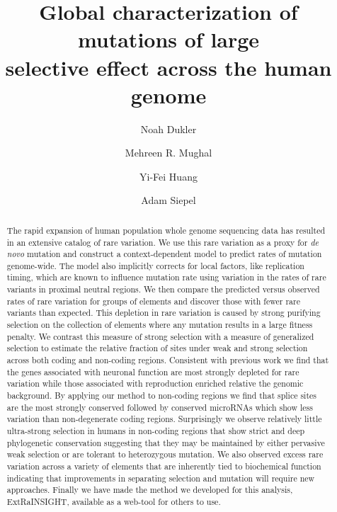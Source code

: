 \documentclass[11pt]{article}
\title{Global characterization of mutations of large \\
  selective effect across the human genome}
\author[1]{Noah Dukler}
\author[1]{Mehreen R. Mughal}
\author[2]{Yi-Fei Huang}
\author[1]{Adam Siepel}
\affil[1]{Simons Center for Quantitative Biology, Cold Spring Harbor Laboratory, Cold Spring Harbor, NY}
\affil[2]{Department of Biology and Huck Institutes of the Life Sciences, University Park, PA}
\date{}
\begin{document}
\maketitle


\begin{abstract}
The rapid expansion of human population whole genome sequencing data has resulted in an extensive catalog of rare variation. We use this rare variation as a proxy for \textit{de novo} mutation and construct a context-dependent model to predict rates of mutation genome-wide. The model also implicitly corrects for local factors, like replication timing, which are known to influence mutation rate using variation in the rates of rare variants in proximal neutral regions. We then compare the predicted versus observed rates of rare variation for groups of elements and discover those with fewer rare variants than expected. This depletion in rare variation is caused by strong purifying selection on the collection of elements where any mutation results in a large fitness penalty. We contrast this measure of strong selection with a measure of generalized selection to estimate the relative fraction of sites under weak and strong selection across both coding and non-coding regions. Consistent with previous work we find that the genes associated with neuronal function are most strongly depleted for rare variation while those associated with reproduction enriched relative the genomic background. By applying our method to non-coding regions we find that splice sites are the most strongly conserved followed by conserved microRNAs which show less variation than non-degenerate coding regions. Surprisingly we observe relatively little ultra-strong selection in humans in non-coding regions that show strict and deep phylogenetic conservation suggesting that they may be maintained by either pervasive weak selection or are tolerant to heterozygous mutation.  We also observed excess rare variation across a variety of elements that are inherently tied to biochemical function indicating that improvements in separating selection and mutation will require new approaches. Finally we have made the method we developed for this analysis, ExtRaINSIGHT, available as a web-tool for others to use.

\end{abstract}
\end{document}
